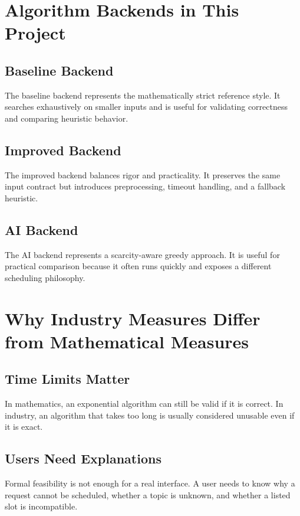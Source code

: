 \documentclass[12pt,a4paper]{article}
\begin{document}
\section{Algorithm Backends in This Project}

\subsection{Baseline Backend}

The baseline backend represents the mathematically strict reference style. It searches exhaustively on smaller inputs and is useful for validating correctness and comparing heuristic behavior.

\subsection{Improved Backend}

The improved backend balances rigor and practicality. It preserves the same input contract but introduces preprocessing, timeout handling, and a fallback heuristic.

\subsection{AI Backend}

The AI backend represents a scarcity-aware greedy approach. It is useful for practical comparison because it often runs quickly and exposes a different scheduling philosophy.

\section{Why Industry Measures Differ from Mathematical Measures}

\subsection{Time Limits Matter}

In mathematics, an exponential algorithm can still be valid if it is correct. In industry, an algorithm that takes too long is usually considered unusable even if it is exact.

\subsection{Users Need Explanations}

Formal feasibility is not enough for a real interface. A user needs to know why a request cannot be scheduled, whether a topic is unknown, and whether a listed slot is incompatible.
\end{document}
